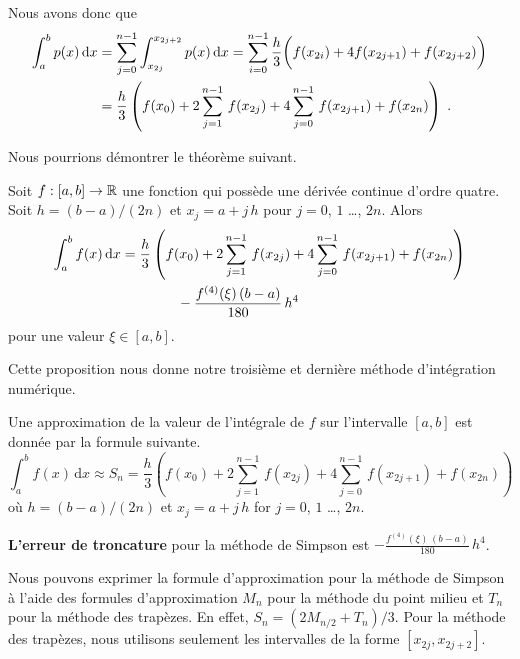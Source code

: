 {Nous avons donc que
\begin{align*}
\int_a^b p(x) \,\mathrm{d}x &= \sum_{j=0}^{n-1} \int_{x_{2j}}^{x_{2j+2}}p(x)  \,\mathrm{d}x
= \sum_{i=0}^{n-1} \frac{h}{3}
\bigg(f(x_{2i}) + 4 f(x_{2j+1}) + f(x_{2j+2}) \bigg) \\
&= \frac{h}{3} \left(f(x_0) + 2\sum_{j=1}^{n-1}\,f(x_{2j}) + 4
\sum_{j=0}^{n-1}\,f(x_{2j+1}) + f(x_{2n}) \right) \; .
\end{align*}

Nous pourrions démontrer le théorème suivant.

\begin{prop}
Soit $f:[a,b]\rightarrow \mathbb{R}$ une fonction qui possède une dérivée
continue d'ordre quatre.  Soit $h=(b-a)/(2n)$ et $x_j = a+j\,h$ pour
$j=0$, $1$ \ldots, $2n$.  Alors
\begin{align*}
\int_{a}^{b} f(x)\,\mathrm{d}x &= \frac{h}{3} \left(f(x_0)
+ 2\sum_{j=1}^{n-1}\,f(x_{2j}) + 4 \sum_{j=0}^{n-1}\,f(x_{2j+1})
+ f(x_{2n}) \right) \\
& \qquad \qquad - \frac{f^{(4)}(\xi)\,(b-a)}{180}\, h^4
\end{align*}
pour une valeur $\xi \in [a,b]$.
\end{prop}

Cette proposition nous donne notre troisième et dernière méthode
d'intégration numérique.

\begin{meth} 
Une approximation de la valeur de l'intégrale de $f$ sur l'intervalle
$[a,b]$ est donnée par la formule suivante.
\[
\int_{a}^{b} f(x)\,\text{d}x \approx  S_n =
\frac{h}{3} \left(f(x_0) + 2\sum_{j=1}^{n-1}\,f(x_{2j}) + 4
\sum_{j=0}^{n-1}\,f(x_{2j+1}) + f(x_{2n}) \right)
\]
où $h=(b-a)/(2n)$ et $x_j = a+j\,h$ for $j=0$, $1$ \ldots, $2n$.

{\bfseries L'erreur de troncature}
pour la méthode de Simpson est
$\displaystyle  - \frac{f^{(4)}(\xi)\,(b-a)}{180}\, h^4 $.
\label{CSR}
\end{meth}

\begin{rmk}
Nous pouvons exprimer la formule d'approximation pour la méthode de Simpson
à l'aide des formules d'approximation $M_n$ pour la méthode du point
milieu et $T_n$ pour la méthode des trapèzes.  En effet,
$S_n = (2 M_{n/2} + T_n)/3$.  Pour la méthode des trapèzes, nous utilisons
seulement les intervalles de la forme $[x_{2j},x_{2j+2}]$.
\end{rmk}

}
